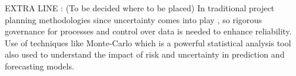 EXTRA LINE : (To be decided where to be placed) In traditional project planning methodologies since uncertainty comes into play  , so  rigorous governance  for processes and control over data is needed to enhance reliability. Use of techniques like Monte-Carlo which is a powerful statistical analysis tool also used to understand the impact of risk and uncertainty in prediction and forecasting models.